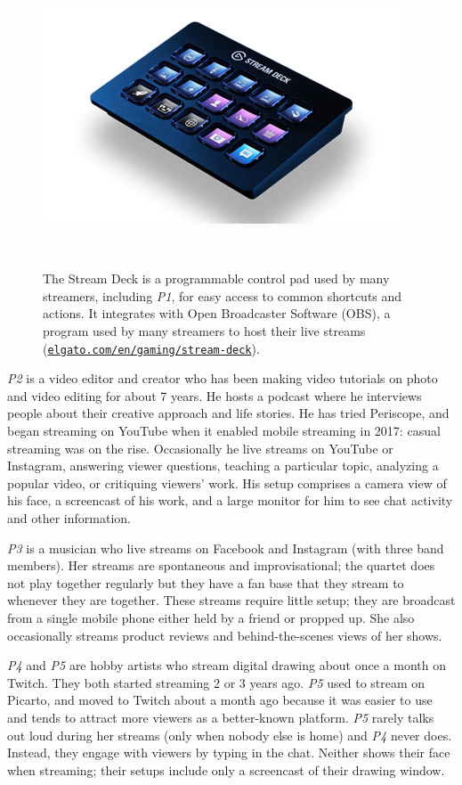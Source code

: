 \begin{figure}[b!]
\centering
  \includegraphics[width=0.5\columnwidth]{liveclips/figures/streamdeck.png}
  \caption{The Stream Deck is a programmable control pad used by many streamers, including \textit{P1}, for easy access to common shortcuts and actions. It integrates with Open Broadcaster Software (OBS), a program used by many streamers to host their live streams (\href{https://www.elgato.com/en/gaming/stream-deck}{\nolinkurl{elgato.com/en/gaming/stream-deck}}).}~\label{fig:livestream_streamdeck}
  \vspace{-0.2in}
\end{figure}

\textit{P2} is a video editor and creator who has been making video tutorials on photo and video editing for about 7 years. He hosts a podcast where he interviews people about their creative approach and life stories. He has tried Periscope, and began streaming on YouTube when it enabled mobile streaming in 2017: casual streaming was on the rise. Occasionally he live streams on YouTube or Instagram, answering viewer questions, teaching a particular topic, analyzing a popular video, or critiquing viewers' work. His setup comprises a camera view of his face, a screencast of his work, and a large monitor for him to see chat activity and other information.

\textit{P3} is a musician who live streams on Facebook and Instagram (with three band members). Her streams are spontaneous and improvisational; the quartet does not play together regularly but they have a fan base that they stream to whenever they are together. These streams require little setup; they are broadcast from a single mobile phone either held by a friend or propped up. She also occasionally streams product reviews and behind-the-scenes views of her shows.

\textit{P4} and \textit{P5} are hobby artists who stream digital drawing about once a month on Twitch. They both started streaming 2 or 3 years ago. \textit{P5} used to stream on Picarto, and moved to Twitch about a month ago because it was easier to use and tends to attract more viewers as a better-known platform. \textit{P5} rarely talks out loud during her streams (only when nobody else is home) and \textit{P4} never does. Instead, they engage with viewers by typing in the chat. Neither shows their face when streaming; their setups include only a screencast of their drawing window. 

